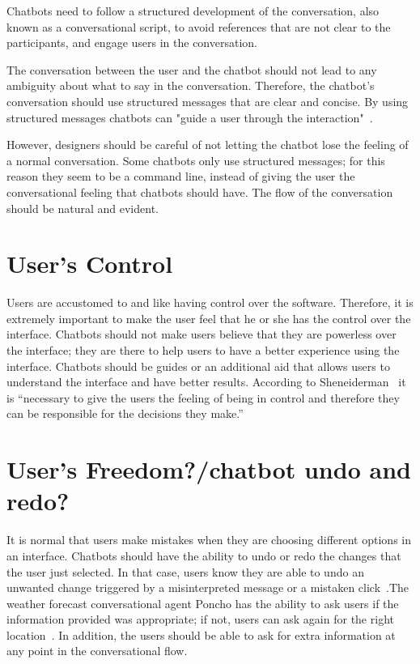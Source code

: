 \documentclass[a4paper,10pt]{article}
\begin{document}
Chatbots need to follow a structured development of the conversation, also known as a conversational script, to avoid references that are not clear to the participants, and engage users in the conversation.

The conversation between the user and the chatbot should not lead to any ambiguity about what to say in the conversation. Therefore, the chatbot's conversation should use structured messages that are clear and concise. By using structured messages chatbots can "guide a user through the interaction"~\cite{HeuristicsWebPage}.

However, designers should be careful of not letting the chatbot lose the feeling of a normal conversation. Some chatbots only use structured messages; for this reason they seem to be a command line, instead of giving the user the conversational feeling that chatbots should have. The flow of the conversation should be natural and evident. 


\section{User's Control}

Users are accustomed to and like having control over the software. Therefore, it is extremely important to make the user feel that he or she has the control over the interface. Chatbots should not make users believe that they are powerless over the interface; they are there to help users to have a better experience using the interface. Chatbots should be guides or an additional aid that allows users to understand the interface and have better results. According to Sheneiderman~\cite{shneiderman1997direct} it is ``necessary to give the users the feeling of being in control and therefore they can be responsible for the decisions they make.” 

\section{User's Freedom?/chatbot undo and redo? }

It is normal that users make mistakes when they are choosing different options in an interface. Chatbots should have the ability to undo or redo the changes that the user just selected. In that case, users know they are able to undo an unwanted change triggered by a misinterpreted message or a mistaken click~\cite{HeuristicsWebPage}.The weather forecast conversational agent Poncho has the ability to ask users if the information provided was appropriate; if not, users can ask again for the right location~\cite{poncho2017}. In addition, the users should be able to ask for extra information at any point in the conversational flow.
\end{document}
